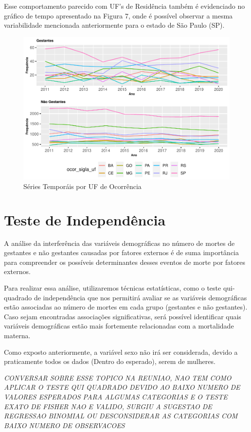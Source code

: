 \documentclass[
]{article}
\begin{document}
Esse comportamento parecido com UF's de Residência também é evidenciado
no gráfico de tempo apresentado na Figura 7, onde é possível observar a
mesma variabilidade mencionada anteriormente para o estado de São Paulo
(SP).

\begin{figure}
\centering
\includegraphics{RelatorioV01_files/figure-latex/unnamed-chunk-14-1.pdf}
\caption{Séries Temporáis por UF de Ocorrência}
\end{figure}

\hypertarget{teste-de-independuxeancia}{%
\section{Teste de Independência}\label{teste-de-independuxeancia}}

A análise da interferência das variáveis demográficas no número de
mortes de gestantes e não gestantes causadas por fatores externos é de
suma importância para compreender os possíveis determinantes desses
eventos de morte por fatores externos.

Para realizar essa análise, utilizaremos técnicas estatísticas, como o
teste qui-quadrado de independência que nos permitirá avaliar se as
variáveis demográficas estão associadas ao número de mortes em cada
grupo (gestantes e não gestantes). Caso sejam encontradas associações
significativas, será possível identificar quais variáveis demográficas
estão mais fortemente relacionadas com a mortalidade materna.

Como exposto anteriormente, a variável sexo não irá ser considerada,
devido a praticamente todos os dados (Dentro do esperado), serem de
mulheres.

\emph{CONVERSAR SOBRE ESSE TOPICO NA REUNIAO, NAO TEM COMO APLICAR O
TESTE QUI QUADRADO DEVIDO AO BAIXO NUMERO DE VALORES ESPERADOS PARA
ALGUMAS CATEGORIAS E O TESTE EXATO DE FISHER NAO E VALIDO, SURGIU A
SUGESTAO DE REGRESSAO BINOMIAL OU DESCONSIDERAR AS CATEGORIAS COM BAIXO
NUMERO DE OBSERVACOES}
\end{document}
